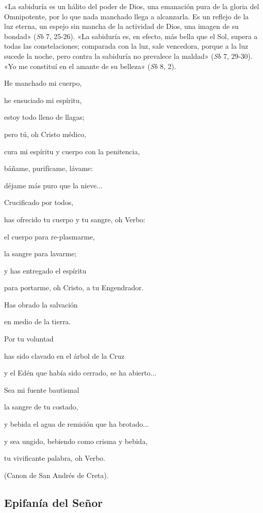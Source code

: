 \documentclass[]{article}
\begin{document}
«La sabiduría es un hálito del poder de Dios, una emanación pura de la
gloria del Omnipotente, por lo que nada manchado llega a alcanzarla. Es
un reflejo de la luz eterna, un espejo sin mancha de la actividad de
Dios, una imagen de su bondad» (\emph{Sb} 7, 25-26). «La sabiduría es,
en efecto, más bella que el Sol, supera a todas las constelaciones;
comparada con la luz, sale vencedora, porque a la luz sucede la noche,
pero contra la sabiduría no prevalece la maldad» (\emph{Sb} 7, 29-30).
«Yo me constituí en el amante de su belleza» (\emph{Sb} 8, 2).

He manchado mi cuerpo,

he ensuciado mi espíritu,

estoy todo lleno de llagas;

pero tú, oh Cristo médico,

cura mi espíritu y cuerpo con la penitencia,

báñame, purifícame, lávame:

déjame más puro que la nieve...

Crucificado por todos,

has ofrecido tu cuerpo y tu sangre, oh Verbo:

el cuerpo para re-plasmarme,

la sangre para lavarme;

y has entregado el espíritu

para portarme, oh Cristo, a tu Engendrador.

Has obrado la salvación

en medio de la tierra.

Por tu voluntad

has sido clavado en el árbol de la Cruz

y el Edén que había sido cerrado, se ha abierto...

Sea mi fuente bautismal

la sangre de tu costado,

y bebida el agua de remisión que ha brotado...

y sea ungido, bebiendo como crisma y bebida,

tu vivificante palabra, oh Verbo.

(Canon de San Andrés de Creta).

\subsection{Epifanía del Señor}\label{epifanuxeda-del-seuxf1or}
\end{document}
